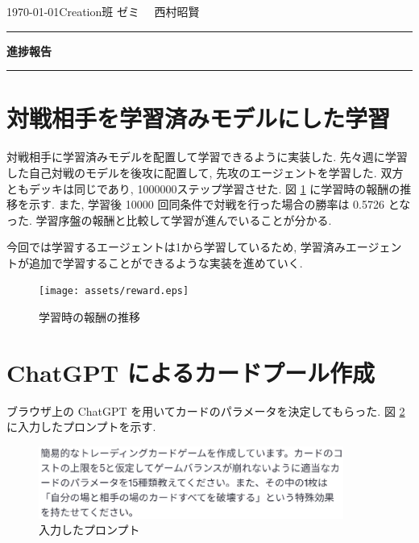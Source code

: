 \documentclass{jarticle}     %
\begin{document}
  \noindent
  \hspace{1em}

  \today Creation班 ゼミ
  \hfill
  \ \  西村昭賢 

  \vspace{2mm}
  \hrule
  \begin{center}
  {\Large \bf 進捗報告}
  \end{center}
  \hrule
  \vspace{3mm}


\section{対戦相手を学習済みモデルにした学習}
対戦相手に学習済みモデルを配置して学習できるように実装した.
先々週に学習した自己対戦のモデルを後攻に配置して, 先攻のエージェントを学習した.
双方ともデッキは同じであり, 1000000ステップ学習させた.
図 \ref{fig:fwfp} に学習時の報酬の推移を示す.
また, 学習後 10000 回同条件で対戦を行った場合の勝率は 0.5726 となった. 学習序盤の報酬と比較して学習が進んでいることが分かる.
\par
今回では学習するエージェントは1から学習しているため, 学習済みエージェントが追加で学習することができるような実装を進めていく.

\begin{figure}[ht]
  \centering
  \texttt{[image: assets/reward.eps]}
  \vspace{-0.3cm}
  \caption{学習時の報酬の推移}
  \label{fig:fwfp}
\end{figure}



\section{ChatGPT によるカードプール作成}
ブラウザ上の ChatGPT を用いてカードのパラメータを決定してもらった.
図 \ref{fig:pronpt} に入力したプロンプトを示す.
\begin{figure}[ht]
  \centering
  \includegraphics[width=100mm]{assets/pronpt.eps}
  \vspace{-0.3cm}
  \caption{入力したプロンプト}
  \label{fig:pronpt}
\end{figure}
\end{document}
